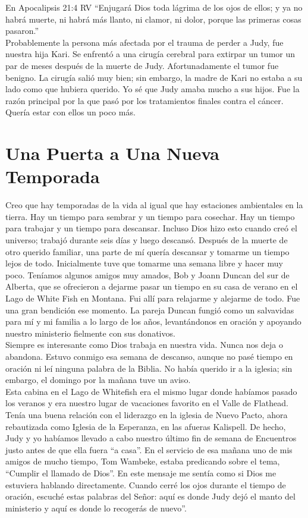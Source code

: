 \documentclass[twoside, 12pt]{book}
\begin{document}
En Apocalipsis 21:4 RV “Enjugará Dios toda lágrima de los ojos de ellos; y ya no habrá muerte, ni habrá más llanto, ni clamor, ni dolor, porque las primeras cosas pasaron.”\\

Probablemente la persona más afectada por el trauma de perder a Judy, fue nuestra hija Kari. Se enfrentó a una cirugía cerebral para extirpar un tumor un par de meses después de la muerte de Judy. Afortunadamente el tumor fue benigno. La cirugía salió muy bien; sin embargo, la madre de Kari no estaba a su lado como que hubiera querido. Yo sé que Judy amaba mucho a sus hijos. Fue la razón principal por la que pasó por los tratamientos finales contra el cáncer. Quería estar con ellos un poco más.\\

\section{Una Puerta a Una Nueva Temporada}
 
Creo que hay temporadas de la vida al igual que hay estaciones ambientales en la tierra. Hay un tiempo para sembrar y un tiempo para cosechar. Hay un tiempo para trabajar y un tiempo para descansar. Incluso Dios hizo esto cuando creó el universo; trabajó durante seis días y luego descansó. Después de la muerte de otro querido familiar, una parte de mí quería descansar y tomarme un tiempo lejos de todo.  Inicialmente tuve que tomarme una semana libre y hacer muy poco. Teníamos algunos amigos muy amados, Bob y Joann Duncan del sur de Alberta, que se ofrecieron a dejarme pasar un tiempo en su casa de verano en el Lago de White Fish en Montana. Fui allí para relajarme y alejarme de todo. Fue una gran bendición ese momento. La pareja Duncan fungió como un salvavidas para mí y mi familia a lo largo de los años, levantándonos en oración y apoyando nuestro ministerio fielmente con sus donativos.\\

Siempre es interesante como Dios trabaja en nuestra vida. Nunca nos deja o abandona.  Estuvo conmigo esa semana de descanso, aunque no pasé tiempo en oración ni leí ninguna palabra de la Biblia.  No había querido ir a la iglesia; sin embargo, el domingo por la mañana tuve un aviso.\\

Esta cabina en el Lago de Whitefish era el mismo lugar donde habíamos pasado los veranos y era nuestro lugar de vacaciones favorito en el Valle de Flathead. Tenía una buena relación con el liderazgo en la iglesia de Nuevo Pacto, ahora rebautizada como Iglesia de la Esperanza, en las afueras Kalispell. De hecho, Judy y yo habíamos llevado a cabo nuestro último fin de semana de Encuentros justo antes de que ella fuera “a casa”. En el servicio de esa mañana uno de mis amigos de mucho tiempo, Tom Wambeke, estaba predicando sobre el tema, “Cumplir el llamado de Dios”. En este mensaje me sentía como si Dios me estuviera hablando directamente. Cuando cerré los ojos durante el tiempo de oración, escuché estas palabras del Señor: aquí es donde Judy dejó el manto del ministerio y aquí es donde lo recogerás de nuevo”.\\
\end{document}
